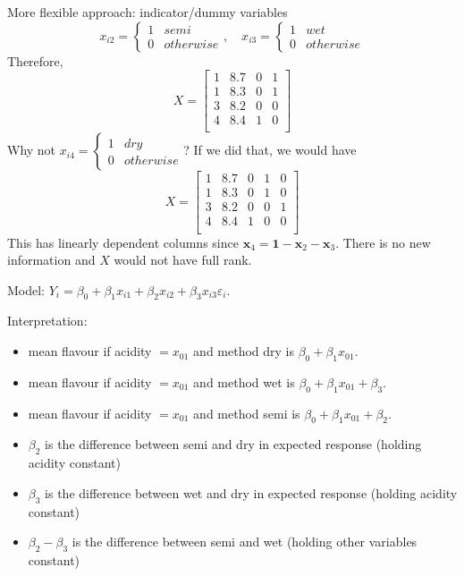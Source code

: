 More flexible approach: indicator/dummy variables
\[ x_{i2}=\begin{cases*}
        1 & semi\\
        0 & otherwise
    \end{cases*},\quad
    x_{i3}=\begin{cases*}
        1 & wet\\
        0 & otherwise
    \end{cases*} \]
Therefore,
\[ X=\begin{bmatrix}
        1 & 8.7 & 0 & 1 \\
        1 & 8.3 & 0 & 1 \\
        3 & 8.2 & 0 & 0 \\
        4 & 8.4 & 1 & 0 \\
    \end{bmatrix} \]
Why not $ x_{i4}=\begin{cases*}
        1 & dry\\
        0 & otherwise
    \end{cases*} $? If we did that, we would have
\[ X=\begin{bmatrix}
        1 & 8.7 & 0 & 1 & 0 \\
        1 & 8.3 & 0 & 1 & 0 \\
        3 & 8.2 & 0 & 0 & 1 \\
        4 & 8.4 & 1 & 0 & 0 \\
    \end{bmatrix} \]
This has linearly dependent columns since
$ \symbf{x}_4=\symbf{1}-\symbf{x}_2-\symbf{x}_3 $.
There is no new information and $ X $
would not have full rank.

Model: $ Y_i=\beta_0+\beta_1x_{i1}+\beta_2x_{i2}+\beta_3x_{i3}\varepsilon_i $.

Interpretation:
\begin{itemize}
    \item mean flavour if acidity $=x_{01} $
          and method dry is $ \beta_0+\beta_1x_{01} $.
    \item mean flavour if acidity $=x_{01} $
          and method wet is $ \beta_0+\beta_1x_{01}+\beta_3 $.
    \item mean flavour if acidity $=x_{01} $
          and method semi is $ \beta_0+\beta_1x_{01}+\beta_2 $.
    \item $ \beta_2 $ is the difference between
          semi and dry in expected response (holding acidity constant)
    \item $ \beta_3 $ is the difference between
          wet and dry in expected response (holding acidity constant)
    \item $ \beta_2-\beta_3 $ is the difference between
          semi and wet (holding other variables constant)
\end{itemize}

